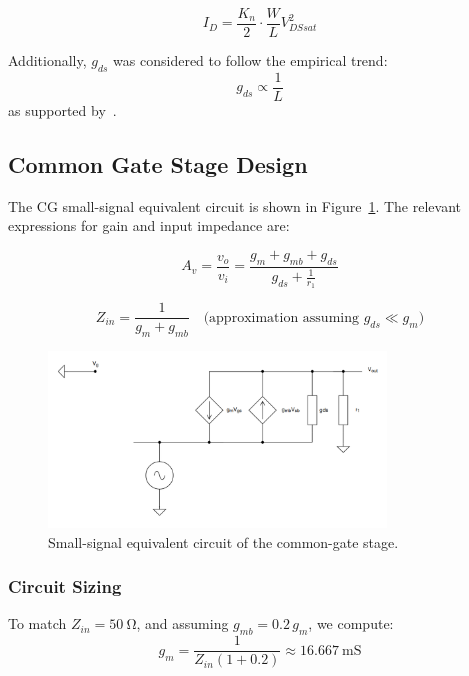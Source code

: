 \begin{equation}
    I_D = \frac{K_n}{2} \cdot \frac{W}{L} V_{DSsat}^2 
    \label{eq:ID_eq}
\end{equation}

Additionally, $g_{ds}$ was considered to follow the empirical trend:
\[
g_{ds} \propto \frac{1}{L}
\]
as supported by~\cite{AnalogCircDesign}.

\subsection{Common Gate Stage Design}

The CG small-signal equivalent circuit is shown in Figure~\ref{fig:CG_SmallSignal}. The relevant expressions for gain and input impedance are:

\begin{equation}
    A_v = \frac{v_o}{v_i} = \frac{g_m + g_{mb} + g_{ds}}{g_{ds} + \frac{1}{r_1}}
    \label{eq:CG_Gain}
\end{equation}

\begin{equation}
    Z_{in} = \frac{1}{g_m + g_{mb}} \quad \text{(approximation assuming $g_{ds} \ll g_m$)}
    \label{eq:CG_Zin}
\end{equation}

\begin{figure}[H]
    \centering
    \includegraphics[width=0.8\textwidth]{Images/CG_SmallSignal.png}
    \caption{Small-signal equivalent circuit of the common-gate stage.}
    \label{fig:CG_SmallSignal}
\end{figure}
\subsubsection{Circuit Sizing}

To match $Z_{in} = \SI{50}{\ohm}$, and assuming $g_{mb} = 0.2\,g_m$, we compute:
\[
g_m = \frac{1}{Z_{in}(1 + 0.2)} \approx \SI{16.667}{\milli\siemens}
\]

